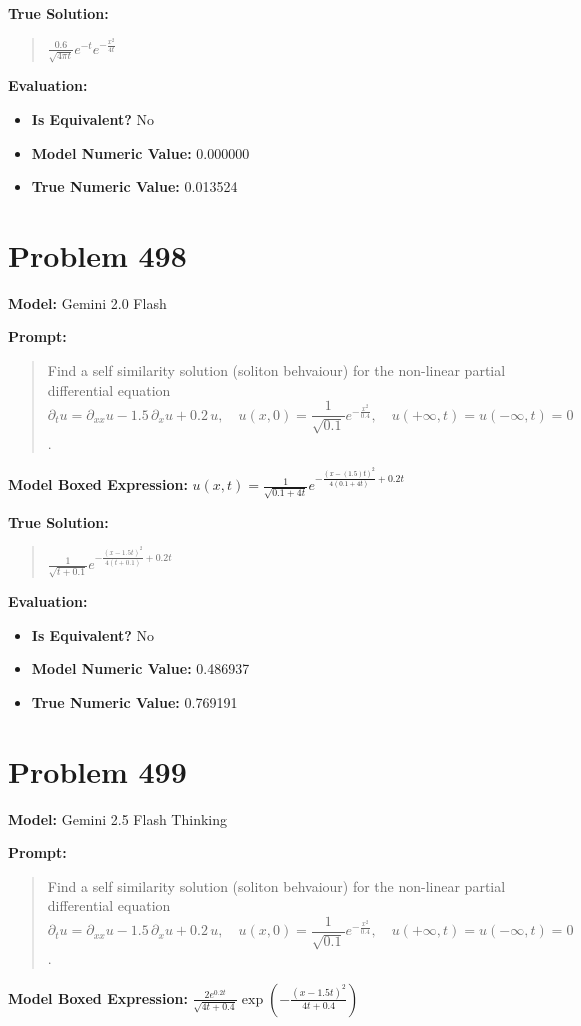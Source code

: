 \documentclass{article}
\begin{document}
\textbf{True Solution:}
\begin{quote}
$\frac{0.6}{\sqrt{4 \pi t}} e^{-t} e^{-\frac{x^2}{4t}}$
\end{quote}

\textbf{Evaluation:}
\begin{itemize}
\item \textbf{Is Equivalent?} No
\item \textbf{Model Numeric Value:} 0.000000
\item \textbf{True Numeric Value:} 0.013524
\end{itemize}
\vspace{1cm}
\section*{Problem 498}
\textbf{Model:} Gemini 2.0 Flash

\textbf{Prompt:}
\begin{quote}
Find a self similarity solution (soliton behvaiour) for the non-linear partial differential equation $$\partial_{t} u = \partial_{xx} u - 1.5 \, \partial_{x} u + 0.2 \, u, \quad u(x,0) = \frac{1}{\sqrt{0.1}} e^{-\frac{x^2}{0.4}}, \quad u(+\infty,t) = u(-\infty,t) = 0$$.
\end{quote}
\textbf{Model Boxed Expression:} $u(x,t) = \frac{1}{\sqrt{0.1 + 4t}} e^{-\frac{(x-(1.5)t)^2}{4(0.1 + 4t)} + 0.2t}$

\textbf{True Solution:}
\begin{quote}
$\frac{1}{\sqrt{t+0.1}} e^{-\frac{(x-1.5t)^2}{4(t+0.1)} + 0.2t}$
\end{quote}

\textbf{Evaluation:}
\begin{itemize}
\item \textbf{Is Equivalent?} No
\item \textbf{Model Numeric Value:} 0.486937
\item \textbf{True Numeric Value:} 0.769191
\end{itemize}
\vspace{1cm}
\section*{Problem 499}
\textbf{Model:} Gemini 2.5 Flash Thinking

\textbf{Prompt:}
\begin{quote}
Find a self similarity solution (soliton behvaiour) for the non-linear partial differential equation $$\partial_{t} u = \partial_{xx} u - 1.5 \, \partial_{x} u + 0.2 \, u, \quad u(x,0) = \frac{1}{\sqrt{0.1}} e^{-\frac{x^2}{0.4}}, \quad u(+\infty,t) = u(-\infty,t) = 0$$.
\end{quote}
\textbf{Model Boxed Expression:} $\frac{2e^{0.2t}}{\sqrt{4t+0.4}} \exp\left(-\frac{(x-1.5t)^2}{4t+0.4}\right)$
\end{document}
